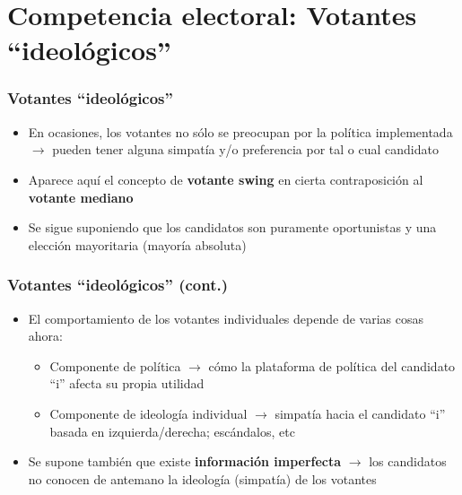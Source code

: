 \documentclass[14pt,aspectratio=169]{beamer}
\begin{document}
\section{Competencia electoral: Votantes ``ideológicos''}

\begin{frame}\frametitle{Votantes ``ideológicos''}
\begin{itemize}
\item En ocasiones, los votantes no sólo se preocupan por la
  política implementada $\longrightarrow$ pueden tener alguna simpatía
  y/o preferencia por tal o cual candidato
  \item Aparece aquí el concepto de \textbf{votante swing} en cierta
    contraposición al \textbf{votante mediano}
    \item Se sigue suponiendo que los candidatos son puramente
      oportunistas y una elección mayoritaria (mayoría absoluta) 
\end{itemize}
\end{frame}


\begin{frame}\frametitle{Votantes ``ideológicos'' (cont.)}
\begin{itemize}
\item El comportamiento de los votantes individuales depende de varias
  cosas ahora:
  \begin{itemize}\itemsep 5pt \medskip
  \item Componente de política $\longrightarrow$ cómo la plataforma de
    política del candidato ``i'' afecta su propia utilidad
    \item Componente de ideología individual $\longrightarrow$
      simpatía hacia el candidato ``i'' basada en izquierda/derecha;
      escándalos, etc
    \end{itemize}
    \item Se supone también que existe \textbf{información imperfecta}
      $\longrightarrow$ los candidatos no conocen de antemano la
      ideología (simpatía) de los votantes
\end{itemize}
\end{frame}
\end{document}
